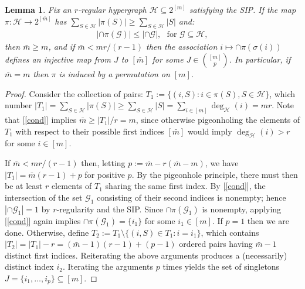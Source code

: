 \documentclass[9pt,twocolumn]{pnas-new}
\newtheorem{lemma}{Lemma}
\renewcommand{\eqref}[1]{\textnormal{[\ref{#1}]}}
\begin{document}
\begin{lemma}\label{NonEmptyLemma} 
Fix an $r$-regular hypergraph $\mathcal{H} \subseteq 2^{[m]}$ satisfying the SIP. If the map $\pi: \mathcal{H} \to 2^{[\bar m]}$ has $\sum_{S \in \mathcal{H}} |\pi(S)| \geq \sum_{S \in \mathcal{H}} |S|$ and:
\begin{align}\label{cond}
|\cap \pi(\mathcal{G})| \leq |\cap \mathcal{G} |,\ \ \   \text{for } \mathcal{G} \subseteq \mathcal{H},
\end{align}
%
then $\bar m \geq m$, and if $\bar m < mr / (r-1)$ then the association $i \mapsto \cap \pi(\sigma(i))$ defines an injective map from $J$ to $[\bar m]$ for some $J \in {[m] \choose p}$. In particular, if $\bar m = m$ then $\pi$ is induced by a permutation on $[m]$.
\end{lemma}

\begin{proof}
Consider the collection of pairs: $T_1 := \{(i, S): i \in \pi(S), S \in \mathcal{H}\}$, which number $|T_1| = \sum_{S \in \mathcal{H}} |\pi(S)| \geq \sum_{S \in \mathcal{H}} |S| = \sum_{i \in [m]} \deg_\mathcal{H}(i) = mr$. Note that \eqref{cond} implies $\bar m \geq |T_1| / r = m$, since otherwise pigeonholing the elements of $T_1$ with respect to their possible first indices $[\bar m]$ would imply $\deg_\mathcal{H}(i) > r$ for some $i \in [m]$.

If $\bar m < mr / (r-1)$ then, letting $p := \bar m - r( \bar m - m)$, we have $|T_1| = \bar m (r - 1) + p$ for positive $p$. By the pigeonhole principle, there must then be at least $r$ elements of $T_1$ sharing the same first index. By \eqref{cond}, the intersection of the set $\mathcal{G}_1$ consisting of their second indices is nonempty; hence $|\cap \mathcal{G}_1| = 1$ by $r$-regularity and the SIP. Since $\cap \pi(\mathcal{G}_1)$ is nonempty, applying \eqref{cond} again implies $\cap \pi(\mathcal{G}_1) = \{i_1\}$ for some $i_1 \in [m]$. If $p=1$ then we are done. Otherwise, define $T_2 := T_1 \setminus \{(i,S) \in T_1: i = i_1\}$, which contains $|T_2| = |T_1| - r = (\bar m - 1)(r-1) + (p-1)$ ordered pairs having $\bar m - 1$ distinct first indices. Reiterating the above arguments produces a (necessarily) distinct index $i_2$. Iterating the arguments $p$ times yields the set of singletons \mbox{$J = \{i_1, \ldots, i_p\} \subseteq [m]$}.
\end{proof}
\end{document}
